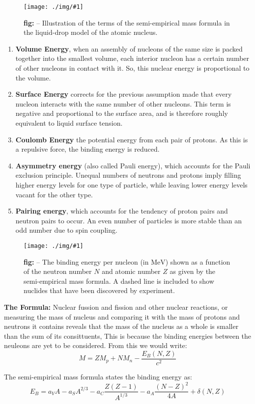 \documentclass[10pt,a4paper]{article}
\newcounter{figurecounter}
\newcommand{\img}[3]{
    \begin{figure}[h!]
        \centering
        \captionsetup{justification=centering,margin=0cm,labelformat=empty}
        \texttt{[image: ./img/\#1]}
        \label{figure}
        \caption{\small\textbf{fig: \thefigurecounter} -- \textcolor{darkliver}{#3}}
    \end{figure}
    \addtocounter{figurecounter}{1}}
\newcommand{\mev}{\text{MeV}}
\begin{document}
\img{liquiddropmodel}{0.7}{Illustration of the terms of the semi-empirical mass formula in the liquid-drop model of the atomic nucleus.}

\begin{enumerate}
    \item \textbf{Volume Energy}, when an assembly of nucleons of the same size is packed together into the smallest volume, each interior nucleon has a certain number of other nucleons in contact with it. So, this nuclear energy is proportional to the volume.
    \item \textbf{Surface Energy} corrects for the previous assumption made that every nucleon interacts with the same number of other nucleons. This term is negative and proportional to the surface area, and is therefore roughly equivalent to liquid surface tension.
    \item \textbf{Coulomb Energy} the potential energy from each pair of protons. As this is a repulsive force, the binding energy is reduced.
    \item \textbf{Asymmetry energy} (also called Pauli energy), which accounts for the Pauli exclusion principle. Unequal numbers of neutrons and protons imply filling higher energy levels for one type of particle, while leaving lower energy levels vacant for the other type.
    \item \textbf{Pairing energy}, which accounts for the tendency of proton pairs and neutron pairs to occur. An even number of particles is more stable than an odd number due to spin coupling.
\end{enumerate}

\img{bindingenergies}{0.5}{The binding energy per nucleon (in $\mev$) shown as a function of the neutron number $N$ and atomic number $Z$ as given by the semi-empirical mass formula. A dashed line is included to show nuclides that have been discovered by experiment.}

\textbf{The Formula:} Nuclear fussion and fission and other nuclear reactions, or measuring the mass of nucleus and comparing it with the mass of protons and neutrons it contains reveals that the mass of the nucleus as a whole is smaller than the sum of its consittuents, This is because the binding energies between the neuleons are yet to be considered. From this we would write:
\begin{equation}
    M = ZM_p + NM_n - \frac{E_B(N,Z)}{c^2}
\end{equation}

The semi-empirical mass formula states the binding energy as:
\begin{equation}
    E_B = a_V A - a_S A^{2/3} - a_C\frac{Z(Z-1)}{A^{1/3}}-a_A\frac{(N-Z)^2}{4A} +\delta(N,Z)
\end{equation}
\end{document}
